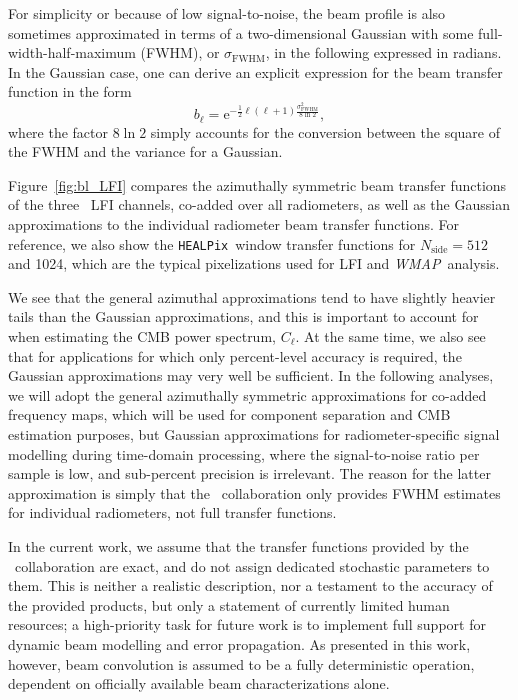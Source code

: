 \documentclass[onecolumn]{aa}
\def\WMAP{\emph{WMAP}}
\newcommand{\HEALPix}[0]{\texttt{HEALPix}}
\newcommand{\e}{\mathrm e}
\begin{document}
For simplicity or because of low signal-to-noise, the beam profile is also
sometimes approximated in terms of a two-dimensional Gaussian with
some full-width-half-maximum (FWHM), or $\sigma_{\mathrm{FWHM}}$, in the
following expressed in radians. In the Gaussian case, one can derive an
explicit expression for the beam transfer function in the form
\begin{equation}
  b_{\ell} = \e^{-\frac{1}{2}\ell(\ell+1)\frac{\sigma_{\mathrm{FWHM}}^2}{8\ln 2}},
\end{equation}
where the factor $8\ln 2$ simply accounts for the conversion between
the square of the FWHM and the variance for a Gaussian.

Figure~\ref{fig:bl_LFI} compares the azimuthally symmetric beam
transfer functions of the three \Planck\ LFI channels, co-added over
all radiometers, as well as the Gaussian approximations to the
individual radiometer beam transfer functions. For reference, we also
show the \HEALPix\ window transfer functions for $N_{\mathrm{side}}=512$ and
1024, which are the typical pixelizations used for LFI and \WMAP\
analysis.

We see that the general azimuthal approximations tend to have slightly
heavier tails than the Gaussian approximations, and this is important
to account for when estimating the CMB power spectrum, $C_{\ell}$. At
the same time, we also see that for applications for which only
percent-level accuracy is required, the Gaussian approximations may
very well be sufficient. In the following analyses, we will adopt the
general azimuthally symmetric approximations for co-added frequency
maps, which will be used for component separation and CMB estimation
purposes, but Gaussian approximations for radiometer-specific signal
modelling during time-domain processing, where the signal-to-noise
ratio per sample is low, and sub-percent precision is irrelevant. The
reason for the latter approximation is simply that the
\Planck\ collaboration only provides FWHM estimates for individual
radiometers, not full transfer functions.

In the current work, we assume that the transfer functions provided by
the \Planck\ collaboration are exact, and do not assign dedicated
stochastic parameters to them. This is neither a realistic description, 
nor a testament to the accuracy of the provided
products, but only a statement of currently limited human resources; a
high-priority task for future work is to implement full support for
dynamic beam modelling and error propagation. As presented in this
work, however, beam convolution is assumed to be a fully deterministic
operation, dependent on officially available beam characterizations
alone.
\end{document}
